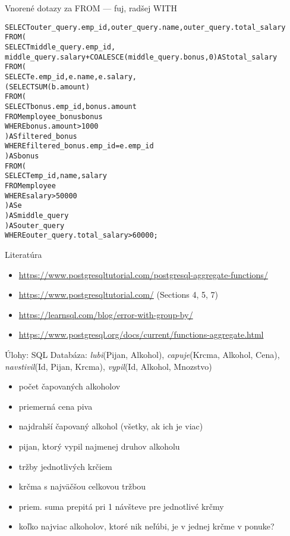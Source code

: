 \documentclass[12pt]{beamer}
\begin{document}
\begin{frame}[fragile]{Vnorené dotazy za FROM --- fuj, radšej WITH}
\scriptsize
\begin{alltt}
SELECT outer_query.emp_id, outer_query.name, outer_query.total_salary
FROM (
  SELECT middle_query.emp_id,
    middle_query.salary + COALESCE(middle_query.bonus, 0) AS total_salary
  FROM (
    SELECT e.emp_id, e.name, e.salary,
      (SELECT SUM(b.amount)
       FROM (
         SELECT bonus.emp_id, bonus.amount
         FROM employee_bonus bonus
         WHERE bonus.amount > 1000
       ) AS filtered_bonus
       WHERE filtered_bonus.emp_id = e.emp_id
      ) AS bonus
    FROM (
      SELECT emp_id, name, salary
      FROM employee
      WHERE salary > 50000
    ) AS e
  ) AS middle_query
) AS outer_query
WHERE outer_query.total_salary > 60000;
\end{alltt}
\end{frame}

\begin{frame}{Literatúra}
\begin{itemize}
\item {\scriptsize\url{https://www.postgresqltutorial.com/postgresql-aggregate-functions/}}
\item {\scriptsize\url{https://www.postgresqltutorial.com/} (Sections 4, 5, 7)}
\item {\scriptsize\url{https://learnsql.com/blog/error-with-group-by/}}
\item {\scriptsize\url{https://www.postgresql.org/docs/current/functions-aggregate.html}}
\end{itemize}
\end{frame}


\begin{frame}{Úlohy: SQL}
Databáza: \emph{lubi}(Pijan, Alkohol), \emph{capuje}(Krcma, Alkohol, Cena),
\emph{navstivil}(Id, Pijan, Krcma), \emph{vypil}(Id, Alkohol, Mnozstvo)
\begin{itemize}
	\item počet čapovaných alkoholov
	\item priemerná cena piva
	\item najdrahší čapovaný alkohol (všetky, ak ich je viac)
    \item pijan, ktorý vypil najmenej druhov alkoholu
	\item tržby jednotlivých krčiem
    \item krčma s najväčšou celkovou tržbou
    \item priem. suma prepitá pri 1 návšteve pre jednotlivé krčmy
    \item koľko najviac alkoholov, ktoré nik neľúbi, je v jednej krčme v ponuke?
\end{itemize}
\end{frame}
\end{document}
